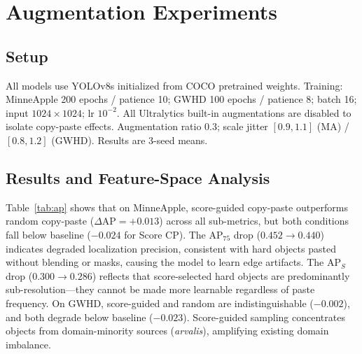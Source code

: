 \documentclass[conference]{IEEEtran}
\begin{document}
\section{Augmentation Experiments}

\subsection{Setup}

All models use YOLOv8s initialized from COCO pretrained weights.
%
%
Training: MinneApple 200 epochs / patience 10; GWHD 100 epochs /
patience 8; batch 16; input $1024{\times}1024$; lr $10^{-2}$.
All Ultralytics built-in augmentations are disabled to isolate
copy-paste effects. Augmentation ratio 0.3; scale jitter
$[0.9,1.1]$ (MA) / $[0.8,1.2]$ (GWHD). Results are 3-seed means.

\subsection{Results and Feature-Space Analysis}

Table~\ref{tab:ap} shows that on MinneApple, score-guided copy-paste
outperforms random copy-paste ($\Delta\mathrm{AP}{=}{+}0.013$) across
all sub-metrics, but both conditions fall below baseline
($-0.024$ for Score CP). The AP$_{75}$ drop ($0.452{\to}0.440$)
indicates degraded localization precision, consistent with hard objects
pasted without blending or masks, causing the model to learn edge
artifacts. The AP$_S$ drop ($0.300{\to}0.286$) reflects that
score-selected hard objects are predominantly sub-resolution---they
cannot be made more learnable regardless of paste frequency.
On GWHD, score-guided and random are indistinguishable ($-0.002$),
and both degrade below baseline ($-0.023$). Score-guided sampling
concentrates objects from domain-minority sources (\textit{arvalis}),
amplifying existing domain imbalance.
\end{document}
